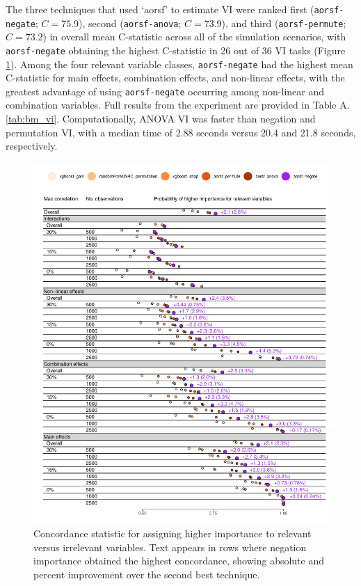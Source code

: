 \documentclass[12pt]{article}\usepackage[]{graphicx}\usepackage[]{xcolor}
\makeatletter
\def\maxwidth{ %
  \ifdim\Gin@nat@width>\linewidth
    \linewidth
  \else
    \Gin@nat@width
  \fi
}
\newenvironment{knitrout}{}{} %
\newcommand{\tabrefAppendix}[1]{Table A.\ref{#1}}
\makeatother
\begin{document}
The three techniques that used `aorsf' to estimate VI were ranked first (\texttt{aorsf-negate}; $C = 75.9$), second (\texttt{aorsf-anova}; $C = 73.9$), and third (\texttt{aorsf-permute}; $C = 73.2$) in overall mean C-statistic across all of the simulation scenarios, with \texttt{aorsf-negate} obtaining the highest C-statistic in 26 out of 36 VI tasks (Figure \ref{fig:bm_vi_viz}). Among the four relevant variable classes, \texttt{aorsf-negate} had the highest mean C-statistic for main effects, combination effects, and non-linear effects, with the greatest advantage of using \texttt{aorsf-negate} occurring among non-linear and combination variables. Full results from the experiment are provided in \tabrefAppendix{tab:bm_vi}. Computationally, ANOVA VI was faster than negation and permutation VI, with a median time of 2.88 seconds versus 20.4 and 21.8 seconds, respectively.

\begin{knitrout}
\color{fgcolor}\begin{figure}
\includegraphics[width=\maxwidth]{figure/bm_vi_viz-1} \caption[Concordance statistic for assigning higher importance to relevant versus irrelevant variables]{Concordance statistic for assigning higher importance to relevant versus irrelevant variables. Text appears in rows where negation importance obtained the highest concordance, showing absolute and percent improvement over the second best technique.}\label{fig:bm_vi_viz}
\end{figure}

\end{knitrout}
\end{document}
